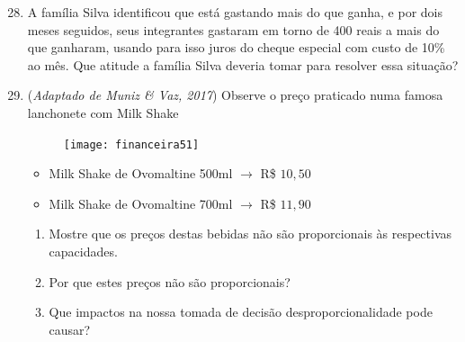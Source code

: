 \begin{enumerate}\setcounter{enumi}{27}
\item A família Silva identificou que está gastando mais do que ganha, e por dois meses seguidos, seus integrantes gastaram em torno de 400 reais a mais do que ganharam, usando para isso juros do cheque especial com custo de 10\% ao mês. Que atitude a família Silva deveria tomar para resolver essa situação? 

\item (\textit{Adaptado de Muniz \& Vaz, 2017}) Observe o preço praticado numa famosa lanchonete com Milk Shake

\begin{figure}[H]
\centering

\texttt{[image: financeira51]}
\end{figure}

\begin{itemize}
  \item Milk Shake de Ovomaltine 500ml $\rightarrow$ R\$ $10{,}50$
  \item Milk Shake de Ovomaltine 700ml $\rightarrow$ R\$ $11{,}90$
\end{itemize}

\begin{enumerate}
  \item Mostre que os preços destas bebidas não são proporcionais às respectivas capacidades.
  \item Por que estes preços não são proporcionais?
  \item Que impactos na nossa tomada de decisão desproporcionalidade pode causar?
\end{enumerate}


\end{enumerate}

\ifnum{}
\clearpage
\else
\notasfinais
\fi




\nocite{*}

